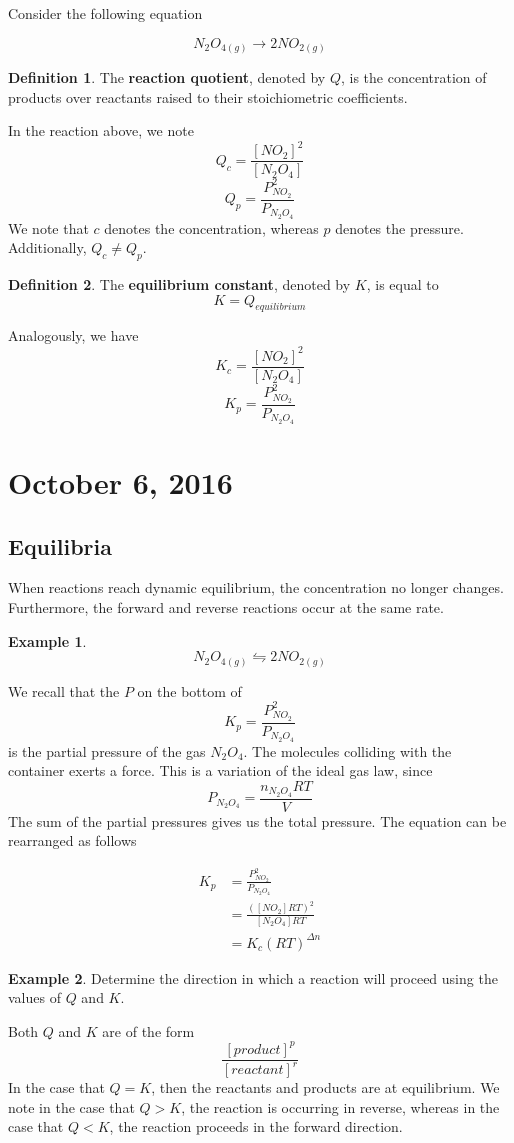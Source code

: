 \documentclass[11pt]{article}
\theoremstyle{plain} %
\theoremstyle{definition}
\newtheorem*{definition}{Definition} %
\theoremstyle{example}
\newtheorem*{example}{Example}
\theoremstyle{remark}
\begin{document}
Consider the following equation 

$$N_2O_{4(g)} \rightarrow 2NO_{2(g)}$$
\begin{definition}
The \textbf{reaction quotient}, denoted by $Q$, is the concentration of products over reactants raised to their stoichiometric coefficients.
\end{definition}

In the reaction above, we note 
$$Q_c = \frac{[NO_2]^2}{[N_2O_4]}$$
$$Q_p = \frac{P_{NO_2}^2}{P_{N_2O_4}}$$
We note that $c$ denotes the concentration, whereas $p$ denotes the pressure. Additionally, $Q_c \neq Q_p$.


\begin{definition}
The \textbf{equilibrium constant}, denoted by $K$, is equal to 
$$K = Q_{equilibrium}$$
\end{definition}
Analogously, we have
$$K_c = \frac{[NO_2]^2}{[N_2O_4]}$$
$$K_p = \frac{P_{NO_2}^2}{P_{N_2O_4}}$$

\section{October 6, 2016}
\subsection{Equilibria}

When reactions reach dynamic equilibrium, the concentration no longer changes. Furthermore, the forward and reverse reactions occur at the same rate.

\begin{example}
$$ N_2O_{4(g)} \leftrightharpoons 2NO_{2(g)}$$
\end{example}

We recall that the $P$ on the bottom of $$K_p = \frac{P_{NO_2}^2}{P_{N_2O_4}}$$ is the partial pressure of the gas $N_2O_4$. The molecules colliding with the container exerts a force. This is a variation of the ideal gas law, since $$P_{N_2O_4} = \frac{n_{N_2O_4}RT}{V}$$ The sum of the partial pressures gives us the total pressure. The equation can be rearranged as follows

\begin{align*}
K_p &= \frac{P_{NO_2}^2}{P_{N_2O_4}}\\
&= \frac{\left([NO_2]RT\right)^2}{[N_2O_4]RT}\\
&= K_c(RT)^{\Delta n}
\end{align*}

\begin{example}
Determine the direction in which a reaction will proceed using the values of $Q$ and $K$.
\end{example}
Both $Q$ and $K$ are of the form $$\frac{[product]^p}{[reactant]^r}$$
In the case that $Q=K$, then the reactants and products are at equilibrium. We note in the case that $Q > K$, the reaction is occurring in reverse, whereas in the case that $Q < K$, the reaction proceeds in the forward direction.
\end{document}

